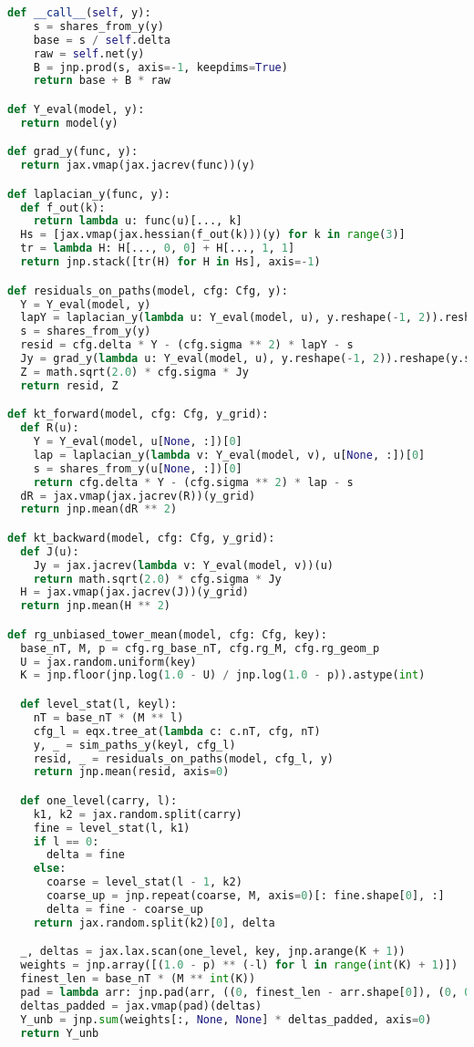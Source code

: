 ﻿\documentclass[11pt,letterpaper,oneside]{article}
\numberwithin{equation}{section}
\newcommand{\1}{\mathbf{1}}
\begin{document}
\begin{lstlisting}[language=Python,basicstyle=\ttfamily\small]
  def __call__(self, y):
    s = shares_from_y(y)
    base = s / self.delta
    raw = self.net(y)
    B = jnp.prod(s, axis=-1, keepdims=True)
    return base + B * raw

def Y_eval(model, y):
  return model(y)

def grad_y(func, y):
  return jax.vmap(jax.jacrev(func))(y)

def laplacian_y(func, y):
  def f_out(k):
    return lambda u: func(u)[..., k]
  Hs = [jax.vmap(jax.hessian(f_out(k)))(y) for k in range(3)]
  tr = lambda H: H[..., 0, 0] + H[..., 1, 1]
  return jnp.stack([tr(H) for H in Hs], axis=-1)

def residuals_on_paths(model, cfg: Cfg, y):
  Y = Y_eval(model, y)
  lapY = laplacian_y(lambda u: Y_eval(model, u), y.reshape(-1, 2)).reshape(y.shape[0], y.shape[1], 3)
  s = shares_from_y(y)
  resid = cfg.delta * Y - (cfg.sigma ** 2) * lapY - s
  Jy = grad_y(lambda u: Y_eval(model, u), y.reshape(-1, 2)).reshape(y.shape[0], y.shape[1], 3, 2)
  Z = math.sqrt(2.0) * cfg.sigma * Jy
  return resid, Z

def kt_forward(model, cfg: Cfg, y_grid):
  def R(u):
    Y = Y_eval(model, u[None, :])[0]
    lap = laplacian_y(lambda v: Y_eval(model, v), u[None, :])[0]
    s = shares_from_y(u[None, :])[0]
    return cfg.delta * Y - (cfg.sigma ** 2) * lap - s
  dR = jax.vmap(jax.jacrev(R))(y_grid)
  return jnp.mean(dR ** 2)

def kt_backward(model, cfg: Cfg, y_grid):
  def J(u):
    Jy = jax.jacrev(lambda v: Y_eval(model, v))(u)
    return math.sqrt(2.0) * cfg.sigma * Jy
  H = jax.vmap(jax.jacrev(J))(y_grid)
  return jnp.mean(H ** 2)

def rg_unbiased_tower_mean(model, cfg: Cfg, key):
  base_nT, M, p = cfg.rg_base_nT, cfg.rg_M, cfg.rg_geom_p
  U = jax.random.uniform(key)
  K = jnp.floor(jnp.log(1.0 - U) / jnp.log(1.0 - p)).astype(int)

  def level_stat(l, keyl):
    nT = base_nT * (M ** l)
    cfg_l = eqx.tree_at(lambda c: c.nT, cfg, nT)
    y, _ = sim_paths_y(keyl, cfg_l)
    resid, _ = residuals_on_paths(model, cfg_l, y)
    return jnp.mean(resid, axis=0)

  def one_level(carry, l):
    k1, k2 = jax.random.split(carry)
    fine = level_stat(l, k1)
    if l == 0:
      delta = fine
    else:
      coarse = level_stat(l - 1, k2)
      coarse_up = jnp.repeat(coarse, M, axis=0)[: fine.shape[0], :]
      delta = fine - coarse_up
    return jax.random.split(k2)[0], delta

  _, deltas = jax.lax.scan(one_level, key, jnp.arange(K + 1))
  weights = jnp.array([(1.0 - p) ** (-l) for l in range(int(K) + 1)])
  finest_len = base_nT * (M ** int(K))
  pad = lambda arr: jnp.pad(arr, ((0, finest_len - arr.shape[0]), (0, 0)))
  deltas_padded = jax.vmap(pad)(deltas)
  Y_unb = jnp.sum(weights[:, None, None] * deltas_padded, axis=0)
  return Y_unb


\end{lstlisting}
\end{document}
